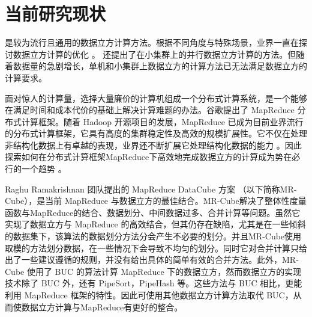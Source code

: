 

\section{当前研究现状}


\cite{agarwal1996computation} \cite{beyer1999bottom} 是较为流行且通用的数据立方计算方法。根据不同角度与特殊场景，业界一直在探讨数据立方计算的优化 \cite{xin2003star} \cite{harinarayan1996implementing} \cite{zhao1997array} \cite{han2001efficient} \cite{wang2002condensed}。\cite{ng2001iceberg} \cite{dehne2002parallelizing} 还提出了在小集群上的并行数据立方计算的方法。但随着数据量的急剧增长，单机和小集群上数据立方的计算方法已无法满足数据立方的计算要求。


面对惊人的计算量，选择大量廉价的计算机组成一个分布式计算系统，是一个能够在满足时间和成本代价的基础上解决计算难题的办法。谷歌提出了 MapReduce \cite{dean2008mapreduce}分布式计算框架。随着 Hadoop \cite{hadoop}开源项目的发展，MapReduce 已成为目前业界流行的分布式计算框架，它具有高度的集群稳定性及高效的规模扩展性。它不仅在处理非结构化数据上有卓越的表现，业界还不断扩展它处理结构化数据的能力 \cite{hbase} \cite{abouzeid2009hadoopdb} \cite{buck2011scihadoop} \cite{pig} \cite{hive}。因此探索如何在分布式计算框架MapReduce下高效地完成数据立方的计算成为势在必行的一个趋势
 \cite{abello2011building} \cite{wang2010mapreducemerge} \cite{sergey2009applying} \cite{lee2012efficient} \cite{wang2013scalable}。
 
 Raghu Ramakrishnan 团队提出的 MapReduce DataCube 方案 \cite{nandi2012data} \cite{nandi2011distributed}（以下简称MR-Cube），是当前 MapReduce 与数据立方的最佳结合。MR-Cube解决了整体性度量函数与MapReduce的结合、数据划分、中间数据过多、合并计算等问题。虽然它实现了数据立方与 MapReduce 的高效结合，但其仍存在缺陷，尤其是在一些倾斜的数据集下，该算法的数据划分方法分会产生不必要的划分。并且MR-Cube使用取模的方法划分数据，在一些情况下会导致不均匀的划分。同时它对合并计算只给出了一些建议遵循的规则，并没有给出具体的简单有效的合并方法。此外，MR-Cube 使用了 BUC \cite{beyer1999bottom} 的算法计算 MapReduce 下的数据立方，然而数据立方的实现技术除了 BUC 外，还有 PipeSort，PipeHash \cite{agarwal1996computation} 等。这些方法与 BUC 相比，更能利用 MapReduce 框架的特性。因此可使用其他数据立方计算方法取代 BUC，从而使数据立方计算与MapReduce有更好的整合。

